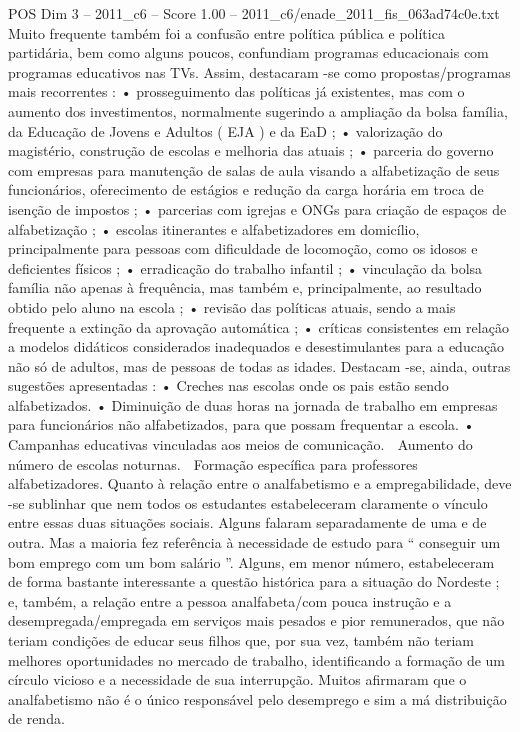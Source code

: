 \begin{textsample}{POS Dim 3 – 2011\_c6 – Score 1.00 – 2011\_c6/enade\_2011\_fis\_063ad74c0e.txt}
Muito frequente também foi a confusão entre política pública e política partidária, bem como alguns poucos, confundiam programas educacionais com programas educativos nas TVs.
Assim, destacaram -se como propostas/programas mais recorrentes : • prosseguimento das políticas já existentes, mas com o aumento dos investimentos, normalmente sugerindo a ampliação da bolsa família, da Educação de Jovens e Adultos ( EJA ) e da EaD ; • valorização do magistério, construção de escolas e melhoria das atuais ; • parceria do governo com empresas para manutenção de salas de aula visando a alfabetização de seus funcionários, oferecimento de estágios e redução da carga horária em troca de isenção de impostos ; • parcerias com igrejas e ONGs para criação de espaços de alfabetização ; • escolas itinerantes e alfabetizadores em domicílio, principalmente para pessoas com dificuldade de locomoção, como os idosos e deficientes físicos ; • erradicação do trabalho infantil ; • vinculação da bolsa família não apenas à frequência, mas também e, principalmente, ao resultado obtido pelo aluno na escola ; • revisão das políticas atuais, sendo a mais frequente a extinção da aprovação automática ; • críticas consistentes em relação a modelos didáticos considerados inadequados e desestimulantes para a educação não só de adultos, mas de pessoas de todas as idades.
Destacam -se, ainda, outras sugestões apresentadas : • Creches nas escolas onde os pais estão sendo alfabetizados. • Diminuição de duas horas na jornada de trabalho em empresas para funcionários não alfabetizados, para que possam frequentar a escola. • Campanhas educativas vinculadas aos meios de comunicação.  Aumento do número de escolas noturnas.  Formação específica para professores alfabetizadores.
Quanto à relação entre o analfabetismo e a empregabilidade, deve -se sublinhar que nem todos os estudantes estabeleceram claramente o vínculo entre essas duas situações sociais.
Alguns falaram separadamente de uma e de outra.
Mas a maioria fez referência à necessidade de estudo para “ conseguir um bom emprego com um bom salário ”.
Alguns, em menor número, estabeleceram de forma bastante interessante a questão histórica para a situação do Nordeste ; e, também, a relação entre a pessoa analfabeta/com pouca instrução e a desempregada/empregada em serviços mais pesados e pior remunerados, que não teriam condições de educar seus filhos que, por sua vez, também não teriam melhores oportunidades no mercado de trabalho, identificando a formação de um círculo vicioso e a necessidade de sua interrupção.
Muitos afirmaram que o analfabetismo não é o único responsável pelo desemprego e sim a má distribuição de renda.

\end{textsample}
